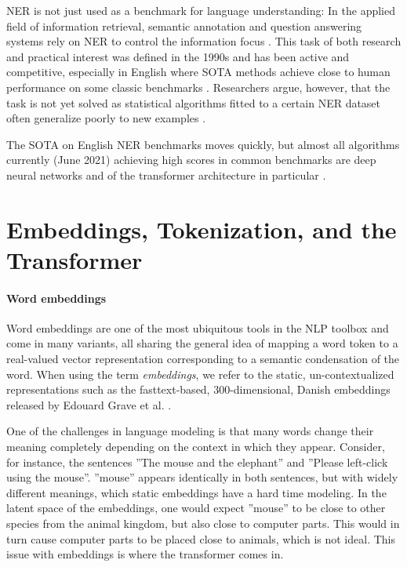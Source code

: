 \documentclass[main.tex]{subfiles}
\begin{document}
NER is not just used as a benchmark for language understanding:
In the applied field of information retrieval, semantic annotation and question answering systems rely on NER to control the information focus \cite[Sec. 2]{marrero2013ner}.
This task of both research and practical interest was defined in the 1990s and has been active and competitive, especially in English where SOTA methods achieve close to human performance on some classic benchmarks \cite{wiki2021ner, marrero2013ner}.
Researchers argue, however, that the task is not yet solved as statistical algorithms fitted to a certain NER dataset often generalize poorly to new examples \cite[Sec. 7.2]{marrero2013ner}.

The SOTA on English NER benchmarks moves quickly, but almost all algorithms currently (June 2021) achieving high scores in common benchmarks are deep neural networks and of the transformer architecture in particular \cite{ruder21ner, pwc21ner}.

\section{Embeddings, Tokenization, and the Transformer}
\label{sec:transformers}

\paragraph{Word embeddings}
Word embeddings are one of the most ubiquitous tools in the NLP toolbox and come in many variants, all sharing the general idea of mapping a word token to a real-valued vector representation corresponding to a semantic condensation of the word.
When using the term \emph{embeddings}, we refer to the static, un-contextualized representations such as the fasttext-based, 300-dimensional, Danish embeddings released by Edouard Grave et al. \cite{grave2018learning}.

One of the challenges in language modeling is that many words change their meaning completely depending on the context in which they appear.
Consider, for instance, the sentences ''The mouse and the elephant'' and ''Please left-click using the mouse''.
''mouse'' appears identically in both sentences, but with widely different meanings, which static embeddings have a hard time modeling.
In the latent space of the embeddings, one would expect ''mouse'' to be close to other species from the animal kingdom, but also close to computer parts.
This would in turn cause computer parts to be placed close to animals, which is not ideal.
This issue with embeddings is where the transformer comes in.
\end{document}

